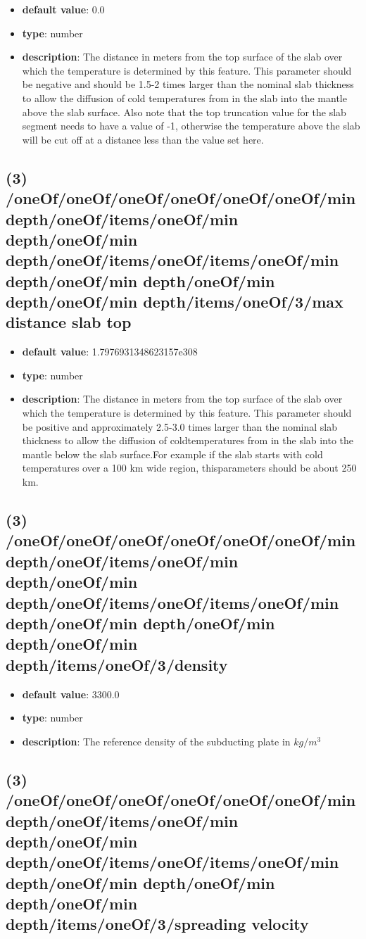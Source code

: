 \begin{itemize}[leftmargin=3em]\item {\bf default value}: 0.0
\item {\bf type}: number
\item {\bf description}: The distance in meters from the top surface of the slab over which the temperature is determined by this feature. This parameter should be negative and should be 1.5-2 times larger than the nominal slab thickness to allow the diffusion of cold temperatures from in the slab into the mantle above the slab surface. Also note that the top truncation value for the slab segment needs to have a value of -1, otherwise the temperature above the slab will be cut off at a distance less than the value set here.
\end{itemize}\subsection{(3) /oneOf/oneOf/oneOf/oneOf/oneOf/oneOf/min depth/oneOf/items/oneOf/min depth/oneOf/min depth/oneOf/items/oneOf/items/oneOf/min depth/oneOf/min depth/oneOf/min depth/oneOf/min depth/items/oneOf/3/max distance slab top}
\begin{itemize}[leftmargin=3em]\item {\bf default value}: 1.7976931348623157e308
\item {\bf type}: number
\item {\bf description}: The distance in meters from the top surface of the slab over which the temperature is determined by this feature. This parameter should be positive and approximately 2.5-3.0 times larger than the nominal slab thickness to allow the diffusion of coldtemperatures from in the slab into the mantle below the slab surface.For example if the slab starts with cold temperatures over a 100 km wide region, thisparameters should be about 250 km.
\end{itemize}\subsection{(3) /oneOf/oneOf/oneOf/oneOf/oneOf/oneOf/min depth/oneOf/items/oneOf/min depth/oneOf/min depth/oneOf/items/oneOf/items/oneOf/min depth/oneOf/min depth/oneOf/min depth/oneOf/min depth/items/oneOf/3/density}
\begin{itemize}[leftmargin=3em]\item {\bf default value}: 3300.0
\item {\bf type}: number
\item {\bf description}: The reference density of the subducting plate in $kg/m^3$
\end{itemize}\subsection{(3) /oneOf/oneOf/oneOf/oneOf/oneOf/oneOf/min depth/oneOf/items/oneOf/min depth/oneOf/min depth/oneOf/items/oneOf/items/oneOf/min depth/oneOf/min depth/oneOf/min depth/oneOf/min depth/items/oneOf/3/spreading velocity}
